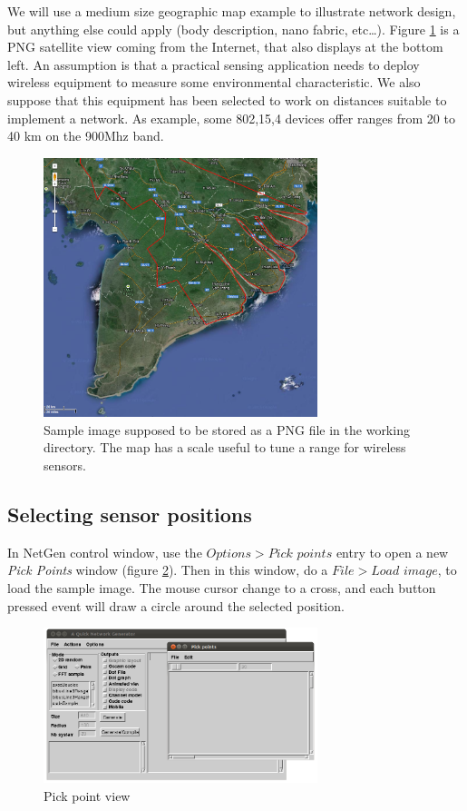 \documentclass[times]{book}
\begin{document}
We will use a medium size geographic map example to illustrate network design, 
but anything else could apply (body description, nano fabric, etc\ldots).
Figure \ref{fig:mekong} is a PNG satellite view coming from the Internet, that also displays
at the bottom left. An assumption is that a practical sensing application needs to deploy
wireless equipment to measure some environmental characteristic. We also suppose that
this equipment has been selected to work on distances suitable to implement a network.
As example, some 802,15,4 devices offer ranges from 20 to 40 km on the 900Mhz band.


\begin{figure}[hbtp]
\begin{center} 
\includegraphics[width=8cm]{mekong.png}
\caption{Sample image supposed to be stored as a PNG file in the working directory.
The map has a scale useful to  tune a  range for wireless sensors.}
\label{fig:mekong}
\end{center}
\end{figure}


\subsection{Selecting sensor positions}

In NetGen control window, use the $Options>Pick$ $points$ entry to  
open a new {\sl Pick Points} window (figure \ref{fig:PickPoint1}). Then in this window, do a $File>Load$ $image$,
to load the sample image. The mouse cursor change to a cross, and each 
button pressed event will draw a circle around the selected position.




\begin{figure}[hbtp]
\begin{center} 
\includegraphics[width=8cm]{PickPoints1.png}
\caption{Pick point view}
\label{fig:PickPoint1}
\end{center}
\end{figure}
\end{document}
